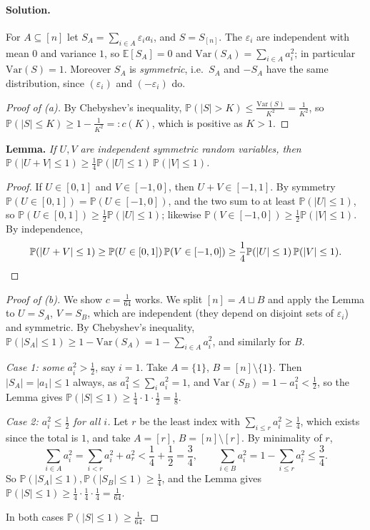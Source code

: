 \documentclass[a4paper,12pt]{article}
\newcommand{\eps}{\varepsilon}
\newcommand{\card}[1]{\left| #1 \right|}
\newcommand{\mb}[1]{\mathbb{#1}}
\begin{document}
\paragraph{Solution.} For $A \subseteq [n]$ let $S_A = \sum_{i \in A} \eps_i a_i$, and $S = S_{[n]}$. The $\eps_i$ are independent with mean $0$ and variance $1$, so $\mb E[S_A] = 0$ and $\mathrm{Var}(S_A) = \sum_{i \in A} a_i^2$; in particular $\mathrm{Var}(S) = 1$. Moreover $S_A$ is \emph{symmetric}, i.e.\ $S_A$ and $-S_A$ have the same distribution, since $(\eps_i)$ and $(-\eps_i)$ do.

\begin{proof}[Proof of (a)]
	By Chebyshev's inequality, $\mb P(\card S > K) \le \frac{\mathrm{Var}(S)}{K^2} = \frac{1}{K^2}$, so $\mb P(\card S \le K) \ge 1 - \frac{1}{K^2} =: c(K)$, which is positive as $K > 1$.
\end{proof}

\medskip
\noindent \textbf{Lemma.} \emph{If $U, V$ are independent symmetric random variables, then $\mb P(\card{U + V} \le 1) \ge \frac14 \mb P(\card U \le 1) \, \mb P(\card V \le 1)$.}

\begin{proof}
	If $U \in [0,1]$ and $V \in [-1, 0]$, then $U + V \in [-1, 1]$. By symmetry $\mb P(U \in [0,1]) = \mb P(U \in [-1, 0])$, and the two sum to at least $\mb P(\card U \le 1)$, so $\mb P(U \in [0,1]) \ge \frac12 \mb P(\card U \le 1)$; likewise $\mb P(V \in [-1, 0]) \ge \frac12 \mb P(\card V \le 1)$. By independence,
	\[
		\mb P(\card{U + V} \le 1) \ge \mb P(U \in [0,1]) \, \mb P(V \in [-1, 0]) \ge \frac14 \mb P(\card U \le 1) \, \mb P(\card V \le 1). \qedhere
	\]
\end{proof}

\begin{proof}[Proof of (b)]
	We show $c = \frac{1}{64}$ works. We split $[n] = A \sqcup B$ and apply the Lemma to $U = S_A$, $V = S_B$, which are independent (they depend on disjoint sets of $\eps_i$) and symmetric. By Chebyshev's inequality, $\mb P(\card{S_A} \le 1) \ge 1 - \mathrm{Var}(S_A) = 1 - \sum_{i \in A} a_i^2$, and similarly for $B$.

	\emph{Case 1: some $a_i^2 > \frac12$}, say $i = 1$. Take $A = \{1\}$, $B = [n] \setminus \{1\}$. Then $\card{S_A} = \card{a_1} \le 1$ always, as $a_1^2 \le \sum_i a_i^2 = 1$, and $\mathrm{Var}(S_B) = 1 - a_1^2 < \frac12$, so the Lemma gives $\mb P(\card S \le 1) \ge \frac14 \cdot 1 \cdot \frac12 = \frac18$.

	\emph{Case 2: $a_i^2 \le \frac12$ for all $i$.} Let $r$ be the least index with $\sum_{i \le r} a_i^2 \ge \frac14$, which exists since the total is $1$, and take $A = [r]$, $B = [n] \setminus [r]$. By minimality of $r$,
	\[
		\sum_{i \in A} a_i^2 = \sum_{i < r} a_i^2 + a_r^2 < \frac14 + \frac12 = \frac34, \qquad \sum_{i \in B} a_i^2 = 1 - \sum_{i \le r} a_i^2 \le \frac34.
	\]
	So $\mb P(\card{S_A} \le 1), \mb P(\card{S_B} \le 1) \ge \frac14$, and the Lemma gives $\mb P(\card S \le 1) \ge \frac14 \cdot \frac14 \cdot \frac14 = \frac{1}{64}$.

	In both cases $\mb P(\card S \le 1) \ge \frac{1}{64}$.
\end{proof}
\end{document}
